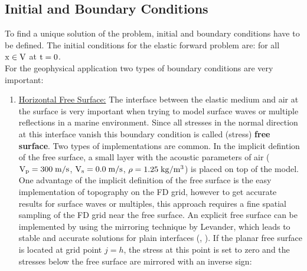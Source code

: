 \subsection{Initial and Boundary Conditions}\label{bound_cond}
To find a unique solution of the problem, initial and boundary conditions have to be defined. The initial conditions for the elastic forward problem are:
for all $\rm{x \in V}$ at $\rm{t=0}$. \\
For the geophysical application two types of boundary conditions are very important:
\begin{enumerate}
\item \underline{Horizontal Free Surface:}
The interface between the elastic medium and air at the surface is very important when trying to model surface waves or multiple reflections 
in a marine environment. Since all stresses in the normal direction at this interface vanish
this boundary condition is called (stress) {\bf{free surface}}. 
Two types of implementations are common. In the implicit defintion of the free surface, a small layer with the acoustic parameters of air 
($\rm{V_p=300\;m/s}$, $\rm{V_s=0.0\;m/s}$, $\rm{\rho=1.25\;kg/m^3}$) is placed on top of the model. One advantage of the implicit definition 
of the free surface is the easy implementation of topography on the FD grid, however to get accurate results for surface waves or multiples, 
this approach requires a fine spatial sampling of the FD grid near the free surface. An explicit free surface can be implemented by using 
the mirroring technique by Levander, which leads to stable and accurate solutions for plain interfaces (\cite{levander:88}, \cite{robertsson:95}). If the planar free surface is located at grid point $j=h$, the stress at this point is set to zero and the stresses below the free surface are mirrored with an inverse sign:
\end{enumerate}
